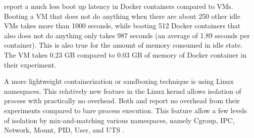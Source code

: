\citet{zhangComparativeStudyContainers2018} report a much less boot up latency in Docker containers compared to VMs.
Booting a VM that does not do anything when there are about 250 other idle VMs takes more than 1000 seconds, while booting 512 Docker containers that also does not do anything only takes 987 seconds (an average of 1.89 seconds per container).
This is also true for the amount of memory consumed in idle state.
The VM takes 0.23 GB compared to 0.03 GB of memory of Docker container in their experiment.

A more lightweight containerization or sandboxing technique is using Linux namespaces.
This relatively new feature in the Linux kernel allows isolation of process with practically no overhead.
Both \citet{beyerReliableBenchmarkingRequirements2019} and \citet{marevs2012new} report no overhead from their experiments compared to bare process execution.
This feature allow a few levels of isolation by mix-and-matching various namespaces, namely Cgroup, IPC, Network, Mount, PID, User, and UTS \citep[namespaces(7)]{manpages}.

